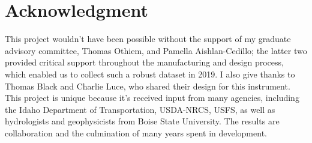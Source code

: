 \chapter*{Acknowledgment}

This project wouldn't have been possible without the support of my graduate advisory committee, Thomas Othiem, and Pamella Aishlan-Cedillo; the latter two provided critical support throughout the manufacturing and design process, which enabled us to collect such a robust dataset in 2019. I also give thanks to Thomas Black and Charlie Luce, who shared their design for this instrument. This project is unique because it's received input from many agencies, including the Idaho Department of Transportation, USDA-NRCS, USFS, as well as hydrologists and geophysicists from Boise State University. The results are collaboration and the culmination of many years spent in development. 